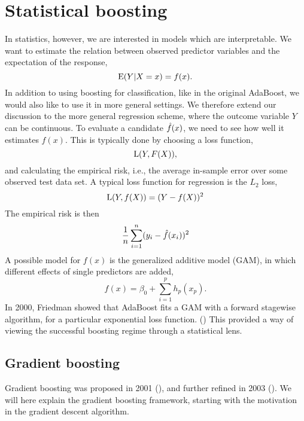 \section{Statistical boosting}\label{sec:sboost}
In statistics, however, we are interested in models which are interpretable. We want to estimate the relation between observed predictor variables and the expectation of the response,
\begin{equation*}
    \operatorname{E}(Y|X=x)=f(x).
\end{equation*}
In addition to using boosting for classification, like in the original AdaBoost, we would also like to use it in more general settings. We therefore extend our discussion to the more general regression scheme, where the outcome variable $Y$ can be continuous. To evaluate a candidate $\hat{f}(x)$, we need to see how well it estimates $f(x)$. This is typically done by choosing a loss function,
\begin{equation}\label{eq:loss}
    \operatorname{L}(Y, F(X)),
\end{equation}
and calculating the empirical risk, i.e., the average in-sample error over some observed test data set. A typical loss function for regression is the $L_2$ loss,
\begin{equation*}
    \operatorname{L}(Y, f(X))=(Y-f(X))^2
\end{equation*}
The empirical risk is then
\begin{equation*}
    \frac{1}{n}\sum_{i=1}^n (y_i-\hat{f}(x_i))^2
\end{equation*}
A possible model for $f(x)$ is the generalized additive model (GAM), in which different effects of single predictors are added,
\begin{equation}\label{eq:gam}
    f(x)=\beta_0+\sum_{i=1}^p h_p(x_p).
\end{equation}
In 2000, Friedman showed that AdaBoost fits a GAM with a forward stagewise algorithm, for a particular exponential loss function. (\cite{friedman2000}) This provided a way of viewing the successful boosting regime through a statistical lens.

\subsection{Gradient boosting}
Gradient boosting was proposed in 2001 (\cite{friedman2001}), and further refined in 2003 (\cite{buhlmann-yu}). We will here explain the gradient boosting framework, starting with the motivation in the gradient descent algorithm.

